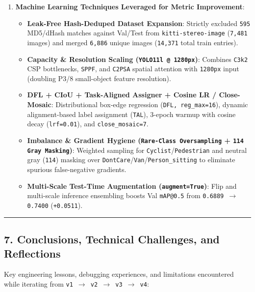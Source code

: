\documentclass[10.5pt,a4paper]{article}
\begin{document}
\begin{enumerate}[leftmargin=1.8em,itemsep=2pt]
\item \textbf{Machine Learning Techniques Leveraged for Metric Improvement}:
\begin{itemize}[leftmargin=1.5em,itemsep=2pt]
\item \textbf{Leak-Free Hash-Deduped Dataset Expansion}: Strictly excluded \texttt{595} MD5/dHash matches against Val/Test from \texttt{kitti-\allowbreak{}stereo-\allowbreak{}image} (\texttt{7,\allowbreak{}481} images) and merged \texttt{6,\allowbreak{}886} unique images (\texttt{14,\allowbreak{}371} total train entries).
\item \textbf{Capacity \& Resolution Scaling (\texttt{YOLO11l @ 1280px})}: Combines \texttt{C3k2} CSP bottlenecks, \texttt{SPPF}, and \texttt{C2PSA} spatial attention with \texttt{1280px} input (doubling P3/8 small-object feature resolution).
\item \textbf{DFL + CIoU + Task-Aligned Assigner + Cosine LR / Close-Mosaic}: Distributional box-edge regression (\texttt{DFL,\allowbreak{} reg\_\allowbreak{}max=16}), dynamic alignment-based label assignment (\texttt{TAL}), 3-epoch warmup with cosine decay (\texttt{lrf=0.\allowbreak{}01}), and \texttt{close\_\allowbreak{}mosaic=7}.
\item \textbf{Imbalance \& Gradient Hygiene (\texttt{Rare-\allowbreak{}Class Oversampling} + \texttt{114 Gray Masking})}: Weighted sampling for \texttt{Cyclist}/\texttt{Pedestrian} and neutral gray (\texttt{114}) masking over \texttt{DontCare}/\texttt{Van}/\texttt{Person\_\allowbreak{}sitting} to eliminate spurious false-negative gradients.
\item \textbf{Multi-Scale Test-Time Augmentation (\texttt{augment=True})}: Flip and multi-scale inference ensembling boosts Val \texttt{mAP@0.\allowbreak{}5} from \texttt{0.\allowbreak{}6889 $\rightarrow$ 0.\allowbreak{}7400} (\texttt{+0.\allowbreak{}0511}).
\end{itemize}
\end{enumerate}

\par\noindent\rule{\textwidth}{0.4pt}\par\medskip

\subsection{7. Conclusions, Technical Challenges, and Reflections}

Key engineering lessons, debugging experiences, and limitations encountered while iterating from \texttt{v1 $\rightarrow$ v2 $\rightarrow$ v3 $\rightarrow$ v4}:
\end{document}
